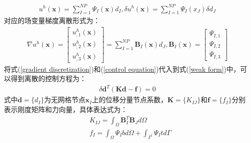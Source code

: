 \documentclass[a4paper]{ctexbook}
\begin{document}
\begin{equation}\label{control equation}
\begin{split}
    u^h(\pmb{x})=\sum_{I=1}^{N\!P}\Psi_I(\pmb{x})d_I,\delta u^h(\pmb{x})=\sum_{I=1}^{N\!P}\Psi_I(x_J)\delta d_J
\end{split}
\end{equation}
对应的场变量梯度离散形式为：
\begin{equation}\label{gradient discretization}
\begin{split}
    \nabla u^h(\pmb{x})=\left[\begin{matrix}
    u_{,1}^h(\pmb{x})\\u_{,2}^h(\pmb{x})\\u_{,3}^h(\pmb{x})\end{matrix}\right]=\sum_{I=1}^{N\!P}\pmb{B}_I(\pmb{x})d_J,\pmb{B}_I(\pmb{x})=\left[\begin{matrix}\Psi_{I,1}\\\Psi_{I,2}\\\Psi_{I,3}\end{matrix}\right]
\end{split}
\end{equation}
将式(\ref{gradient discretization})和(\ref{control equation})代入到式(\ref{weak form})中，可以得到离散的控制方程为：
\begin{equation}
\begin{split}
    \delta\pmb{d}^T(\pmb{K}\pmb{d}-\pmb{f})=0
\end{split}
\end{equation}
式中$\pmb{d}=\{d_I\}$为无网格节点$\pmb{x}_I$上的位移分量节点系数，$\pmb{K}=\{K_{IJ}\}$和$\pmb{f}=\{f_I\}$分别表示刚度矩阵和力向量，具体表达式为：
\begin{equation}
\begin{split}
    &K_{IJ}=\int_{\Omega}\pmb{B}_I^T\pmb{B}_Jd\Omega\\
    &f_I=\int_{\Omega}\Psi_Ibd\Omega+\int_{\Gamma^t}\Psi_Itd\Gamma
\end{split}
\end{equation}
\end{document}
